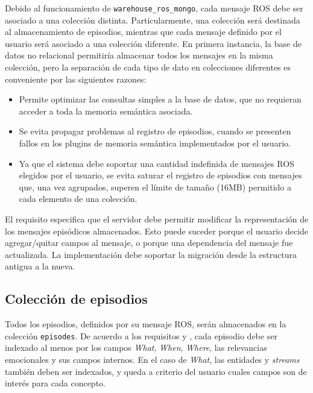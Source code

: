 Debido al funcionamiento de \texttt{warehouse\_ros\_mongo}, cada mensaje ROS debe ser asociado a una colección distinta. Particularmente, una colección será destinada al almacenamiento de episodios, mientras que cada mensaje definido por el usuario será asociado a una colección diferente. En primera instancia, la base de datos no relacional permitiría almacenar todos los mensajes en la misma colección, pero la separación de cada tipo de dato en colecciones diferentes es conveniente por las siguientes razones:
\begin{itemize}
\item Permite optimizar las consultas simples a la base de datos, que no requieran acceder a toda la memoria semántica asociada.
\item Se evita propagar problemas al registro de episodios, cuando se presenten fallos en los plugins de memoria semántica implementados por el usuario.
\item Ya que el sistema debe soportar una cantidad indefinida de mensajes ROS elegidos por el usuario, se evita saturar el registro de episodios con mensajes que, una vez agrupados, superen el límite de tamaño (16MB) permitido a cada elemento de una colección.
\end{itemize}

El requisito  especifica que el servidor debe permitir modificar la representación de los mensajes episódicos almacenados. Esto puede suceder porque el usuario decide agregar/quitar campos al mensaje, o porque una dependencia del mensaje fue actualizada. La implementación debe soportar la migración desde la estructura antigua a la nueva.

\subsection{Colección de episodios}

Todos los episodios, definidos por su mensaje ROS, serán almacenados en la colección \texttt{episodes}. De acuerdo a los requisitos  y , cada episodio debe ser indexado al menos por los campos \textit{What}, \textit{When}, \textit{Where}, las relevancias emocionales y sus campos internos. En el caso de \textit{What}, las entidades y \textit{streams} también deben ser indexados, y queda a criterio del usuario cuales campos son de interés para cada concepto.

